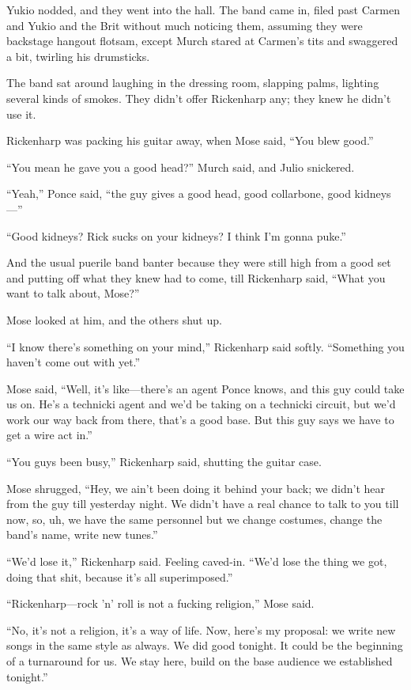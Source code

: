 Yukio nodded, and they went into the hall. The band came in, filed past Carmen and Yukio and the Brit without much noticing them, assuming they were backstage hangout flotsam, except Murch stared at Carmen's tits and swaggered a bit, twirling his drumsticks.

The band sat around laughing in the dressing room, slapping palms, lighting several kinds of smokes. They didn't offer Rickenharp any; they knew he didn't use it.

Rickenharp was packing his guitar away, when Mose said, ``You blew good.''

``You mean he gave you a good head?'' Murch said, and Julio snickered.

``Yeah,'' Ponce said, ``the guy gives a good head, good collarbone, good kidneys—''

``Good kidneys? Rick sucks on your kidneys? I think I'm gonna puke.''

And the usual puerile band banter because they were still high from a good set and putting off what they knew had to come, till Rickenharp said, ``What you want to talk about, Mose?''

Mose looked at him, and the others shut up.

``I know there's something on your mind,'' Rickenharp said softly. ``Something you haven't come out with yet.''

Mose said, ``Well, it's like—there's an agent Ponce knows, and this guy could take us on. He's a technicki agent and we'd be taking on a technicki circuit, but we'd work our way back from there, that's a good base. But this guy says we have to get a wire act in.''

``You guys been busy,'' Rickenharp said, shutting the guitar case.

Mose shrugged, ``Hey, we ain't been doing it behind your back; we didn't hear from the guy till yesterday night. We didn't have a real chance to talk to you till now, so, uh, we have the same personnel but we change costumes, change the band's name, write new tunes.''

``We'd lose it,'' Rickenharp said. Feeling caved-in. ``We'd lose the thing we got, doing that shit, because it's all superimposed.''

``Rickenharp—rock 'n' roll is not a fucking religion,'' Mose said.

``No, it's not a religion, it's a way of life. Now, here's my proposal: we write new songs in the same style as always. We did good tonight. It could be the beginning of a turnaround for us. We stay here, build on the base audience we established tonight.''

